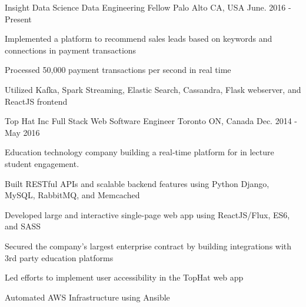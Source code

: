 

\begin{cventries}

  \cventry
    {Insight Data Science} %
    {Data Engineering Fellow} %
    {Palo Alto CA, USA} %
    {June. 2016 - Present} %
    {
      \begin{cvitems} %
        \item {Implemented a platform to recommend sales leads based on keywords and connections in payment transactions}
		\item {Processed 50,000 payment transactions per second in real time}
		\item {Utilized Kafka, Spark Streaming, Elastic Search, Cassandra, Flask webserver, and ReactJS frontend}
      \end{cvitems}
    }

  \cventry
    {Top Hat Inc} %
    {Full Stack Web Software Engineer} %
    {Toronto ON, Canada} %
    {Dec. 2014 - May 2016} %
    {
      \vspace{6mm}
      {Education technology company building a real-time platform for in lecture student engagement.}
      \begin{cvitems} %
        \item {Built RESTful APIs and scalable backend features using Python Django, MySQL, RabbitMQ, and Memcached}
        \item {Developed large and interactive single-page web app using ReactJS/Flux, ES6, and SASS}
        \item {Secured the company's largest enterprise contract by building integrations with 3rd party education platforms}
        \item {Led efforts to implement user accessibility in the TopHat web app}
        \item {Automated AWS Infrastructure using Ansible}
      \end{cvitems}
    }


\end{cventries}
